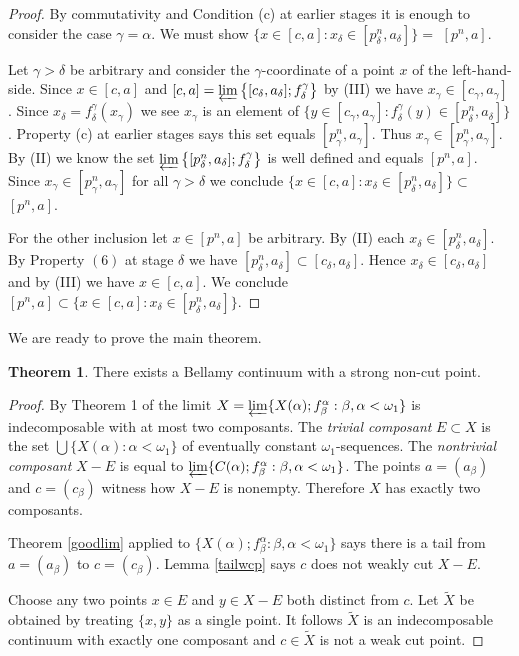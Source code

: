 \documentclass[12pt]{article}
\theoremstyle{plain}
\theoremstyle{definition}
\newcounter{dummy}
\newtheorem{thm}[dummy]{Theorem}
\newcounter{dummy4}
\newcounter{dummy3}
\newcounter{dummy5}
\newcounter{dummy6}
\newcommand{\A}{\ensuremath{\alpha}}
\newcommand{\B}{\ensuremath{\beta}}
\newcommand{\W}{\ensuremath{\omega}}
\newcommand{\G}{\ensuremath{\gamma}}
\newcommand{\D}{\ensuremath{\delta}}
\newcommand{\0}{\ensuremath{\varnothing}}
\begin{document}
	\begin{proof}
		By commutativity and Condition (c) at earlier stages it is enough to consider the case $\G = \A$. We must show $\big \{ x \in [c,a] : x_\D \in [p^n_\D,a_\D] \big \} =$ $ [p^n,a]$. 
		
		Let $\G > \D$ be arbitrary and consider the $\G$-coordinate of a point $x$ of the left-hand-side. Since $x \in [c,a]$ and $[c,a] = \varprojlim \big \{ [c_\D,a_\D] ; f^\G_\D \big \}$ by (III) we have $x_\G \in [c_\G,a_\G]$. Since $x_\D = f^\G_\D(x_\G)$ we see $x_\G$ is an element of $\big \{ y \in [c_\G,a_\G] : f^\G_\D(y) \in [p^n_\D,a_\D] \big \}$. Property (c) at earlier stages says this set equals $[p^n_\G,a_\G]$. Thus \mbox{$x_\G \in [p^n_\G,a_\G]$}. By (II) we know the set $\varprojlim \big \{ [p^n_\D,a_\D] ; f^\G_\D \big \}$ is well defined and equals $[p^n,a]$. Since $x_\G \in [p^n_\G,a_\G]$ for all $\G>\D$ we conclude $\big \{ x \in [c,a] : x_\D \in [p^n_\D,a_\D] \big \} \subset $ $ [p^n,a]$.
		
		
		For the other inclusion let $x \in [p^n,a]$ be arbitrary. By (II) each $x_\D \in [p^n_\D,a_\D]$.  By Property $(6)$ at stage $\D$ we have $[p^n_\D,a_\D] \subset [c_\D,a_\D]$. Hence $x_\D \in [c_\D,a_\D]$ and by (III) we have $x \in [c,a]$. We conclude $[p^n,a] \subset \big \{ x \in [c,a] : x_\D \in [p^n_\D,a_\D] \big \}$.
	\end{proof}
	
	We are ready to prove the main theorem.
	
	\begin{thm}
		There exists a Bellamy continuum with a strong non-cut point.
	\end{thm}
	
	\begin{proof}
		By Theorem 1 of \cite{one} the limit $X = \varprojlim \{X(\A);f^\A_\B: \B,\A < \W_1\}$ is indecomposable with at most two composants.
		The \textit{trivial composant} $E \subset X$ is the set $\bigcup \{X(\A): \A < \W_1\}$ of eventually constant $\W_1$-sequences.
		The \textit{nontrivial composant} $X-E$ is equal to $\varprojlim \{C(\A);f^\A_\B: \B,\A < \W_1\}$.
		The points $a = (a_\B)$ and $c = (c_\B)$ witness how $X-E$ is nonempty.
		Therefore $X$ has exactly two composants.
		
		Theorem \ref{goodlim} applied to $\{X(\A);f^\A_\B: \B,\A < \W_1\}$ says there is a tail from $a = (a_\B)$ to $c = (c_\B)$.
		Lemma \ref{tailwcp} says $c$ does not weakly cut $X-E$.
		
		
		Choose any two points $x \in E$ and $y \in X-E$ both distinct from $c$. 
		Let $\widetilde X$ be obtained by treating $\{x,y\}$ as a single point.
		It follows $\widetilde X$ is an indecomposable continuum with exactly one composant and $c \in \widetilde X$ is not a weak cut point.
	\end{proof}
	
\end{document}
